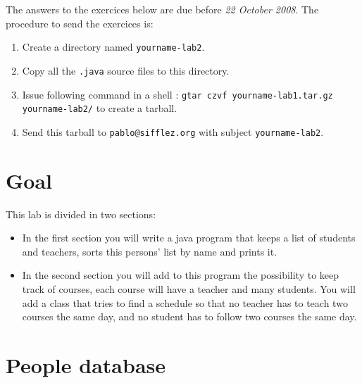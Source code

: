 \documentclass{exercices}
\begin{document}

The answers to the exercices below are due before \emph{22 October 2008}. 
The procedure to send the exercices is:
\begin{enumerate}
  \item Create a directory named \verb!yourname-lab2!.
  \item Copy all the \verb!.java! source files to this directory.
  \item Issue following command in a shell : \verb!gtar czvf yourname-lab1.tar.gz yourname-lab2/!
        to create a tarball.
  \item Send this tarball to \verb!pablo@sifflez.org! with subject \verb!yourname-lab2!.
\end{enumerate}

\section{Goal}
This lab is divided in two sections:
\begin{itemize}
\item
In the first section you will write a java program that keeps a list of students and teachers, sorts
this persons' list by name and prints it.
\item
In the second section you will add to this program the possibility to keep track of courses, each course
will have a teacher and many students. You will add a class that tries to find a schedule so that
no teacher has to teach two courses the same day, and no student has to follow two courses the same day.
\end{itemize}

\section{People database}
\end{document}
